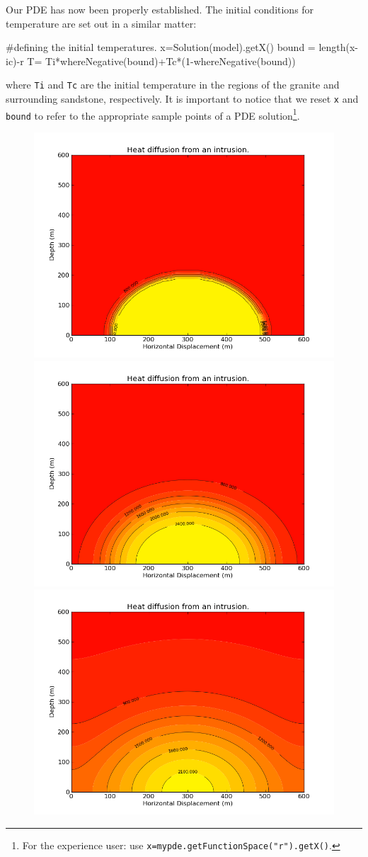 Our PDE has now been properly established. The initial conditions for temperature are set out in a similar matter:
\begin{python}
#defining the initial temperatures.
x=Solution(model).getX()
bound = length(x-ic)-r
T= Ti*whereNegative(bound)+Tc*(1-whereNegative(bound))
\end{python}
where \verb|Ti| and \verb|Tc| are the initial temperature
in the regions of the granite and surrounding sandstone, respectively. It is important to
notice that we reset \verb|x| and \verb|bound| to refer to the appropriate 
sample points of a PDE solution\footnote{For the experience user: use \texttt{x=mypde.getFunctionSpace("r").getX()}.}.

\begin{figure}[ht]
\centerline{\includegraphics[width=4.in]{figures/heatrefraction001.png}}
\centerline{\includegraphics[width=4.in]{figures/heatrefraction030.png}}
\centerline{\includegraphics[width=4.in]{figures/heatrefraction200.png}}

\end{figure}
